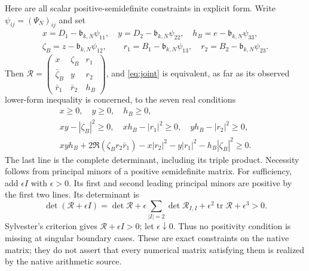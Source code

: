 \documentclass[11pt]{article}
\begin{document}
Here are all scalar positive-semidefinite constraints in explicit form.
Write $\psi_{ij}=(\Psi_N)_{ij}$ and set
\begin{equation}\label{eq:resentries}
 \begin{gathered}
 x=D_1-\mathfrak b_{k,N}\psi_{11},\quad
 y=D_2-\mathfrak b_{k,N}\psi_{22},\quad
 h_B=e-\mathfrak b_{k,N}\psi_{33},\\
 \zeta_B=z-\mathfrak b_{k,N}\psi_{12},\qquad
 r_1=B_1-\mathfrak b_{k,N}\psi_{13},\quad
 r_2=B_2-\mathfrak b_{k,N}\psi_{23}.
 \end{gathered}
\end{equation}
Then $\mathcal R=\left(\begin{smallmatrix}
x&\zeta_B&r_1\\\bar\zeta_B&y&r_2\\\bar r_1&\bar r_2&h_B
\end{smallmatrix}\right)$, and \eqref{eq:joint} is equivalent, as far
as its observed lower-form inequality is concerned, to the seven real
conditions
\begin{equation}\label{eq:allminors}
 \boxed{\begin{gathered}
 x\ge0,\quad y\ge0,\quad h_B\ge0,\\
 xy-|\zeta_B|^2\ge0,\quad xh_B-|r_1|^2\ge0,
 \quad yh_B-|r_2|^2\ge0,\\
 xyh_B+2\Re(\zeta_Br_2\bar r_1)
 -x|r_2|^2-y|r_1|^2-h_B|\zeta_B|^2\ge0.
 \end{gathered}}
\end{equation}
The last line is the complete determinant, including its triple product.
Necessity follows from principal minors of a positive semidefinite
matrix.  For sufficiency, add $\epsilon I$ with $\epsilon>0$.
Its first and second leading principal minors are positive by the
first two lines.  Its determinant is
\[
 \det(\mathcal R+\epsilon I)
 =\det\mathcal R+
 \epsilon\sum_{|I|=2}\det\mathcal R_{I,I}
 +\epsilon^2\operatorname{tr}\mathcal R+\epsilon^3>0.
\]
Sylvester's criterion gives
$\mathcal R+\epsilon I>0$; let $\epsilon\downarrow0$.
Thus no positivity condition is missing at singular boundary cases.
These are exact constraints on the native matrix; they do not assert
that every numerical matrix satisfying them is realized by the native
arithmetic source.
\end{document}
